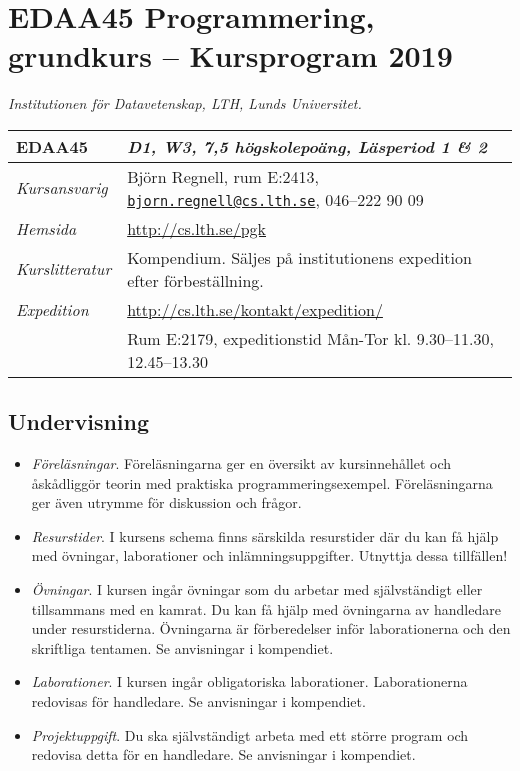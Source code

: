 \documentclass[a4paper,12pt,oneside]{memoir}
\newcommand{\YEAR}{2019}
\begin{document}
\section*{EDAA45 Programmering, grundkurs  -- Kursprogram \YEAR}
\emph{Institutionen för Datavetenskap, LTH, Lunds Universitet.}\\

\begin{longtable}[l]{ll}
\toprule
\textbf{EDAA45} & \textit {D1, W3, 7,5 högskolepoäng, Läsperiod 1 \& 2} \tabularnewline
\midrule
\endhead
\emph{Kursansvarig}   & Björn Regnell, rum E:2413,
                        \href{mailto:bjorn.regnell@cs.lth.se}
                        {\nolinkurl{bjorn.regnell@cs.lth.se}},
                        046--222 90 09\tabularnewline
\emph{Hemsida}        & \url{http://cs.lth.se/pgk}\tabularnewline
\emph{Kurslitteratur} & Kompendium. Säljes på institutionens expedition efter förbeställning.\tabularnewline
\emph{Expedition}     & \url{http://cs.lth.se/kontakt/expedition/}
                        \tabularnewline
                      & Rum E:2179, expeditionstid Mån-Tor kl. 9.30--11.30, 12.45--13.30\tabularnewline

\bottomrule
\end{longtable}

\subsection{Undervisning}\label{undervisning}

\begin{itemize}
\item
  \emph{Föreläsningar}. Föreläsningarna ger en översikt av
  kursinnehållet och åskådliggör teorin med praktiska
  programmeringsexempel. Föreläsningarna ger även utrymme för diskussion
  och frågor.
\item
  \emph{Resurstider}. I kursens schema finns särskilda resurstider
  där du kan få hjälp med övningar, laborationer och
  inlämningsuppgifter. Utnyttja dessa tillfällen!
\item
  \emph{Övningar}. I kursen ingår övningar som du arbetar med
  självständigt eller tillsammans med en kamrat.
  Du kan få hjälp med övningarna av handledare under resurstiderna.
  Övningarna är förberedelser inför laborationerna och den skriftliga tentamen.
  Se anvisningar i kompendiet.
\item
  \emph{Laborationer}. I kursen ingår obligatoriska laborationer.
  Laborationerna redovisas för handledare.
  Se anvisningar i kompendiet.
\item
  \emph{Projektuppgift}. Du ska självständigt arbeta med ett större
  program och redovisa detta för en handledare. Se anvisningar i
  kompendiet.
\end{itemize}
\end{document}

